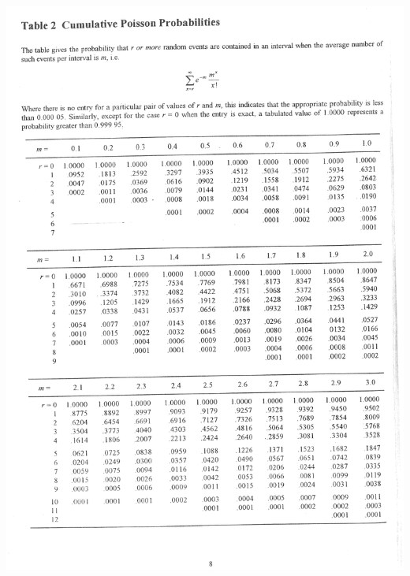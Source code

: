 \documentclass[12pt]{article}
\begin{document}
\newpage


\begin{adjustwidth}{-1cm}{0cm}
\includegraphics[width=1.1\textwidth, trim = 1cm 1cm 1cm 1cm, clip]{mdpois1}
\end{adjustwidth}

\newpage
\end{document}
